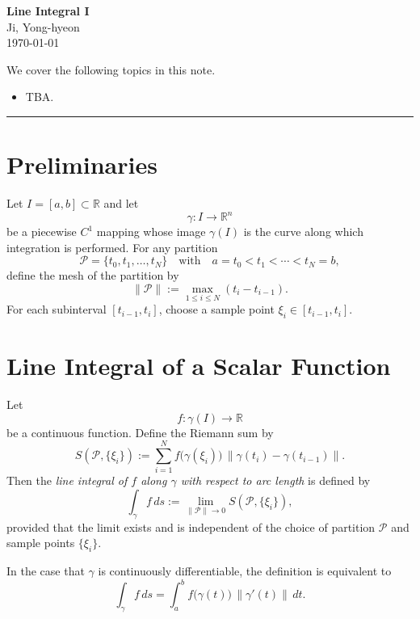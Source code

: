 \documentclass[11pt,openany]{article}
\begin{document}
\begin{center}
	\huge\textbf{Line Integral I}\\
	\vspace{0.5em}
	\large{Ji, Yong-hyeon}\\
	\vspace{0.5em}
	\normalsize{\today}\\
\end{center}

\noindent 
We cover the following topics in this note.
\begin{itemize}
	\item TBA.
\end{itemize}
\hrule\vspace{12pt}

\section*{Preliminaries}
Let \( I = [a,b] \subset \mathbb{R} \) and let 
\[
\gamma : I \to \mathbb{R}^n
\]
be a piecewise \( C^1 \) mapping whose image \( \gamma(I) \) is the curve along which integration is performed. For any partition 
\[
\mathcal{P} = \{t_0, t_1, \ldots, t_N\} \quad \text{with} \quad a = t_0 < t_1 < \cdots < t_N = b,
\]
define the mesh of the partition by
\[
\|\mathcal{P}\| := \max_{1 \le i \le N} (t_i - t_{i-1}).
\]
For each subinterval \([t_{i-1}, t_i]\), choose a sample point \(\xi_i \in [t_{i-1}, t_i]\).

\section*{Line Integral of a Scalar Function}
Let 
\[
f : \gamma(I) \to \mathbb{R}
\]
be a continuous function. Define the Riemann sum by
\[
S(\mathcal{P}, \{\xi_i\}) := \sum_{i=1}^N f\bigl(\gamma(\xi_i)\bigr) \, \|\gamma(t_i)-\gamma(t_{i-1})\|.
\]
Then the \emph{line integral of \(f\) along \(\gamma\) with respect to arc length} is defined by
\[
\int_{\gamma} f \, ds := \lim_{\|\mathcal{P}\| \to 0} S(\mathcal{P}, \{\xi_i\}),
\]
provided that the limit exists and is independent of the choice of partition \(\mathcal{P}\) and sample points \(\{\xi_i\}\).

In the case that \(\gamma\) is continuously differentiable, the definition is equivalent to
\[
\int_{\gamma} f \, ds = \int_a^b f\bigl(\gamma(t)\bigr) \, \|\gamma'(t)\|\,dt.
\]
\end{document}
